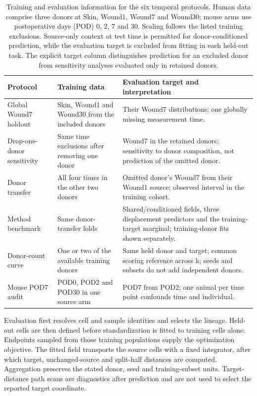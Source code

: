\begin{table}[!htbp]\centering\small
\caption{Training and evaluation information for the six temporal protocols. Human data comprise three donors at Skin, Wound1, Wound7 and Wound30; mouse arms use postoperative days (POD) 0, 2, 7 and 30. Scaling follows the listed training exclusions. Source-only context at test time is permitted for donor-conditioned prediction, while the evaluation target is excluded from fitting in each held-out task. The explicit target column distinguishes prediction for an excluded donor from sensitivity analyses evaluated only in retained donors.}\label{tab:p2protocols}
\begin{tabularx}{\linewidth}{@{}p{36mm}LL@{}}\toprule
Protocol & Training data & Evaluation target and interpretation \\\midrule
Global Wound7 holdout & Skin, Wound1 and Wound30 from the included donors & Their Wound7 distributions; one globally missing measurement time. \\
Drop-one-donor sensitivity & Same time exclusions after removing one donor & Wound7 in the retained donors; sensitivity to donor composition, not prediction of the omitted donor. \\
Donor transfer & All four times in the other two donors & Omitted donor's Wound7 from their Wound1 source; observed interval in the training cohort. \\
Method benchmark & Same donor-transfer folds & Shared/conditioned fields, three displacement predictors and the training-target marginal; training-donor fits shown separately. \\
Donor-count curve & One or two of the available training donors & Same held donor and target; common scoring reference across k; seeds and subsets do not add independent donors. \\
Mouse POD7 audit & POD0, POD2 and POD30 in one source arm & POD7 from POD2; one animal per time point confounds time and individual. \\\bottomrule
\end{tabularx}\end{table}

Evaluation first resolves cell and sample identities and selects the lineage. Held-out cells are then defined before standardization is fitted to training cells alone. Endpoints sampled from those training populations supply the optimization objective. The fitted field transports the source cells with a fixed integrator, after which target, unchanged-source and split-half distances are computed. Aggregation preserves the stated donor, seed and training-subset units. Target-distance path scans are diagnostics after prediction and are not used to select the reported target coordinate.

